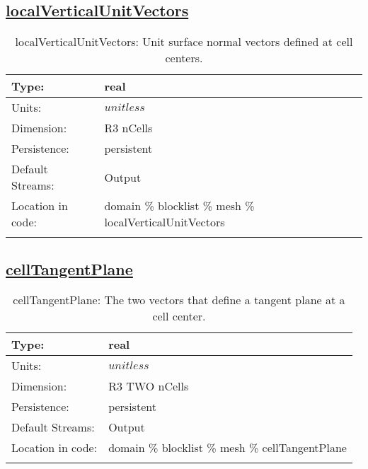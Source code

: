 \subsection[localVerticalUnitVectors]{\hyperref[sec:var_tab_mesh]{localVerticalUnitVectors}}
\label{subsec:var_sec_mesh_localVerticalUnitVectors}
\begin{center}
\begin{longtable}{| p{2.0in} | p{4.0in} |}
        \hline 
        Type: & real \\
        \hline 
        Units: & $unitless$ \\
        \hline 
        Dimension: & R3 nCells \\
        \hline 
        Persistence: & persistent \\
        \hline 
		 Default Streams: & Output  \\
        \hline 
		 Location in code: & domain \% blocklist \% mesh \% localVerticalUnitVectors \\
		 \hline 
    \caption{localVerticalUnitVectors: Unit surface normal vectors defined at cell centers.}
\end{longtable}
\end{center}
\subsection[cellTangentPlane]{\hyperref[sec:var_tab_mesh]{cellTangentPlane}}
\label{subsec:var_sec_mesh_cellTangentPlane}
\begin{center}
\begin{longtable}{| p{2.0in} | p{4.0in} |}
        \hline 
        Type: & real \\
        \hline 
        Units: & $unitless$ \\
        \hline 
        Dimension: & R3 TWO nCells \\
        \hline 
        Persistence: & persistent \\
        \hline 
		 Default Streams: & Output  \\
        \hline 
		 Location in code: & domain \% blocklist \% mesh \% cellTangentPlane \\
		 \hline 
    \caption{cellTangentPlane: The two vectors that define a tangent plane at a cell center.}
\end{longtable}
\end{center}
